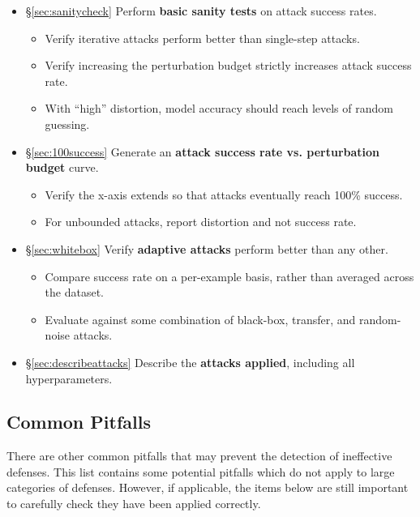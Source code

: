 \documentclass{article} %
\begin{document}
\begin{itemize}[leftmargin=*]
\begin{itemize}[leftmargin=*]
  \end{itemize}
\item \S\ref{sec:sanitycheck} Perform \textbf{basic sanity tests} on attack success rates.
  \begin{itemize}[leftmargin=*]
    \item Verify iterative attacks perform better than single-step attacks.
    \item Verify increasing the perturbation budget strictly increases attack success rate.
    \item With ``high'' distortion, model accuracy should reach levels of random guessing.%
  \end{itemize}
\item \S\ref{sec:100success} Generate an \textbf{attack success rate vs. perturbation budget} curve.
  \begin{itemize}[leftmargin=*]
  \item Verify the x-axis extends so that attacks eventually reach 100\% success.
  \item For unbounded attacks, report distortion and not success rate.
  \end{itemize}
\item \S\ref{sec:whitebox} Verify \textbf{adaptive attacks} perform better than any other.
  \begin{itemize}[leftmargin=*]
  \item Compare success rate on a per-example basis, rather than averaged across the dataset.
  \item Evaluate against some combination of black-box, transfer, and random-noise attacks.
  \end{itemize}
\item \S\ref{sec:describeattacks} Describe the \textbf{attacks applied}, including all hyperparameters.

\end{itemize}

\subsection{Common Pitfalls}
There are other common pitfalls that may prevent the detection of ineffective defenses.
%
This list contains some potential pitfalls which do not apply to
large categories of defenses.
%
However, if applicable, the items below are still important to carefully
check they have been applied correctly.
%
\end{document}
